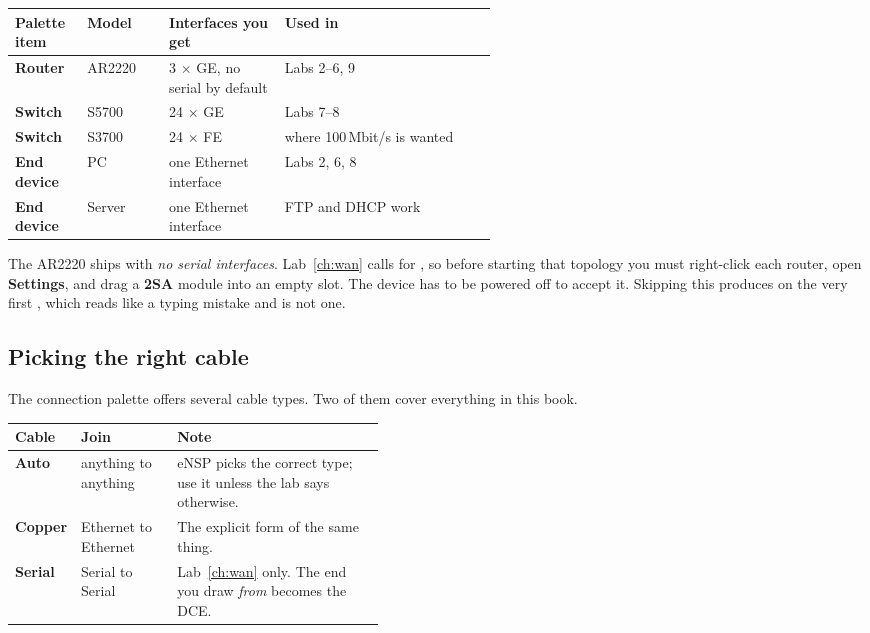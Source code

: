 \begin{center}
\begin{tabularx}{\linewidth}{>{\bfseries}p{0.15\linewidth}p{0.17\linewidth}p{0.24\linewidth}X}
\toprule
Palette item & Model & Interfaces you get & Used in\\\midrule
Router & AR2220 & 3 $\times$ GE, no serial by default & Labs 2--6, 9\\
Switch & S5700 & 24 $\times$ GE & Labs 7--8\\
Switch & S3700 & 24 $\times$ FE & where 100\,Mbit/s is wanted\\
End device & PC & one Ethernet interface & Labs 2, 6, 8\\
End device & Server & one Ethernet interface & FTP and DHCP work\\\bottomrule
\end{tabularx}
\end{center}

\begin{pitfall}
The AR2220 ships with \emph{no serial interfaces}. Lab~\ref{ch:wan} calls
for , so before starting that topology you must
right-click each router, open \textbf{Settings}, and drag a \textbf{2SA}
module into an empty slot. The device has to be powered off to accept it.
Skipping this produces 
on the very first , which reads like a typing
mistake and is not one.
\end{pitfall}

\subsection{Picking the right cable}
The connection palette offers several cable types. Two of them cover
everything in this book.

\begin{center}
\begin{tabularx}{\linewidth}{>{\bfseries}p{0.17\linewidth}p{0.26\linewidth}X}
\toprule
Cable & Join & Note\\\midrule
Auto & anything to anything & eNSP picks the correct type; use it unless the lab says otherwise.\\
Copper & Ethernet to Ethernet & The explicit form of the same thing.\\
Serial & Serial to Serial & Lab~\ref{ch:wan} only. The end you draw \emph{from} becomes the DCE.\\\bottomrule
\end{tabularx}
\end{center}

